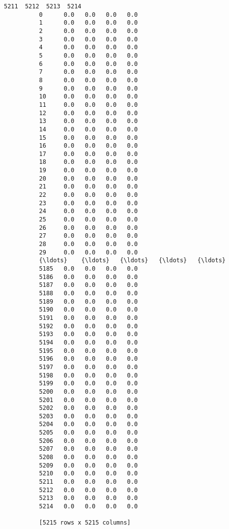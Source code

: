 \documentclass[11pt]{article}
\begin{document}
\begin{Verbatim}[commandchars=\\\{\}]
                5211  5212  5213  5214  
          0      0.0   0.0   0.0   0.0  
          1      0.0   0.0   0.0   0.0  
          2      0.0   0.0   0.0   0.0  
          3      0.0   0.0   0.0   0.0  
          4      0.0   0.0   0.0   0.0  
          5      0.0   0.0   0.0   0.0  
          6      0.0   0.0   0.0   0.0  
          7      0.0   0.0   0.0   0.0  
          8      0.0   0.0   0.0   0.0  
          9      0.0   0.0   0.0   0.0  
          10     0.0   0.0   0.0   0.0  
          11     0.0   0.0   0.0   0.0  
          12     0.0   0.0   0.0   0.0  
          13     0.0   0.0   0.0   0.0  
          14     0.0   0.0   0.0   0.0  
          15     0.0   0.0   0.0   0.0  
          16     0.0   0.0   0.0   0.0  
          17     0.0   0.0   0.0   0.0  
          18     0.0   0.0   0.0   0.0  
          19     0.0   0.0   0.0   0.0  
          20     0.0   0.0   0.0   0.0  
          21     0.0   0.0   0.0   0.0  
          22     0.0   0.0   0.0   0.0  
          23     0.0   0.0   0.0   0.0  
          24     0.0   0.0   0.0   0.0  
          25     0.0   0.0   0.0   0.0  
          26     0.0   0.0   0.0   0.0  
          27     0.0   0.0   0.0   0.0  
          28     0.0   0.0   0.0   0.0  
          29     0.0   0.0   0.0   0.0  
          {\ldots}    {\ldots}   {\ldots}   {\ldots}   {\ldots}  
          5185   0.0   0.0   0.0   0.0  
          5186   0.0   0.0   0.0   0.0  
          5187   0.0   0.0   0.0   0.0  
          5188   0.0   0.0   0.0   0.0  
          5189   0.0   0.0   0.0   0.0  
          5190   0.0   0.0   0.0   0.0  
          5191   0.0   0.0   0.0   0.0  
          5192   0.0   0.0   0.0   0.0  
          5193   0.0   0.0   0.0   0.0  
          5194   0.0   0.0   0.0   0.0  
          5195   0.0   0.0   0.0   0.0  
          5196   0.0   0.0   0.0   0.0  
          5197   0.0   0.0   0.0   0.0  
          5198   0.0   0.0   0.0   0.0  
          5199   0.0   0.0   0.0   0.0  
          5200   0.0   0.0   0.0   0.0  
          5201   0.0   0.0   0.0   0.0  
          5202   0.0   0.0   0.0   0.0  
          5203   0.0   0.0   0.0   0.0  
          5204   0.0   0.0   0.0   0.0  
          5205   0.0   0.0   0.0   0.0  
          5206   0.0   0.0   0.0   0.0  
          5207   0.0   0.0   0.0   0.0  
          5208   0.0   0.0   0.0   0.0  
          5209   0.0   0.0   0.0   0.0  
          5210   0.0   0.0   0.0   0.0  
          5211   0.0   0.0   0.0   0.0  
          5212   0.0   0.0   0.0   0.0  
          5213   0.0   0.0   0.0   0.0  
          5214   0.0   0.0   0.0   0.0  
          
          [5215 rows x 5215 columns]
\end{Verbatim}
            
\end{document}
